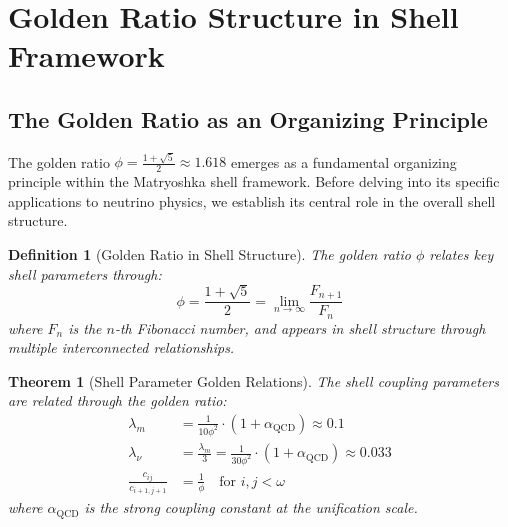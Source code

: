 \documentclass[12pt,a4paper]{article}
\newtheorem{theorem}{Theorem}[section]
\newtheorem{definition}{Definition}[section]
\begin{document}
\section{Golden Ratio Structure in Shell Framework}
\label{sec:golden-ratio}

\subsection{The Golden Ratio as an Organizing Principle}
\label{subsec:organizing-principle}

The golden ratio $\phi = \frac{1+\sqrt{5}}{2} \approx 1.618$ emerges as a fundamental organizing principle within the Matryoshka shell framework. Before delving into its specific applications to neutrino physics, we establish its central role in the overall shell structure.

\begin{definition}[Golden Ratio in Shell Structure]
\label{def:golden-ratio}
The golden ratio $\phi$ relates key shell parameters through:
\begin{equation}
\phi = \frac{1 + \sqrt{5}}{2} = \lim_{n \to \infty} \frac{F_{n+1}}{F_n}
\end{equation}
where $F_n$ is the $n$-th Fibonacci number, and appears in shell structure through multiple interconnected relationships.
\end{definition}

\begin{theorem}[Shell Parameter Golden Relations]
\label{thm:shell-parameters}
The shell coupling parameters are related through the golden ratio:
\begin{align}
\lambda_m &= \frac{1}{10\phi^2} \cdot (1 + \alpha_{\text{QCD}}) \approx 0.1 \\
\lambda_{\nu} &= \frac{\lambda_m}{3} = \frac{1}{30\phi^2} \cdot (1 + \alpha_{\text{QCD}}) \approx 0.033 \\
\frac{c_{ij}}{c_{i+1,j+1}} &= \frac{1}{\phi} \quad \text{for } i, j < \omega
\end{align}
where $\alpha_{\text{QCD}}$ is the strong coupling constant at the unification scale.
\end{theorem}
\end{document}
